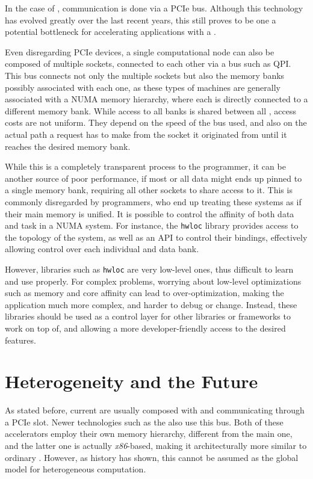 \documentclass[main.tex]{subfiles}
\begin{document}

In the case of \gpus, communication is done via a \acs{PCIe} bus. Although this technology has evolved greatly over the last recent years, this still proves to be one a potential bottleneck for accelerating applications with a \gpu.

Even disregarding \acs{PCIe} devices, a single computational node can also be composed of multiple \cpu sockets, connected to each other via a bus such as \ac{QPI}. This bus connects not only the multiple sockets but also the memory banks possibly associated with each one, as these types of machines are generally associated with a \acs{NUMA} memory hierarchy, where each \cpu is directly connected to a different memory bank. While access to all banks is shared between all \cpus, access costs are not uniform. They depend on the speed of the bus used, and also on the actual path a request has to make from the socket it originated from until it reaches the desired memory bank.

While this is a completely transparent process to the programmer, it can be another source of poor performance, if most or all data might ends up pinned to a single memory bank, requiring all other sockets to share access to it. This is commonly disregarded by programmers, who end up treating these systems as if their main memory is unified. It is possible to control the affinity of both data and task in a \acs{NUMA} system. For instance, the \texttt{hwloc}\cite{broquedis2010hwloc} library provides access to the topology of the system, as well as an API to control their bindings, effectively allowing control over each individual \cpu and data bank.

However, libraries such as \texttt{hwloc} are very low-level ones, thus difficult to learn and use properly. For complex problems, worrying about low-level optimizations such as memory and core affinity can lead to over-optimization, making the application much more complex, and harder to debug or change.
Instead, these libraries should be used as a control layer for other libraries or frameworks to work on top of, and allowing a more developer-friendly access to the desired features.

\section{Heterogeneity and the Future}

As stated before, current \hetplats are usually composed with \cpus and \gpus communicating through a \acs{PCIe} slot. Newer technologies such as the \intel \mic also use this bus. Both of these accelerators employ their own memory hierarchy, different from the main one, and the latter one is actually \textit{x86}-based, making it architecturally more similar to ordinary \cpus. However, as history has shown, this cannot be assumed as the global model for heterogeneous computation.
\end{document}
